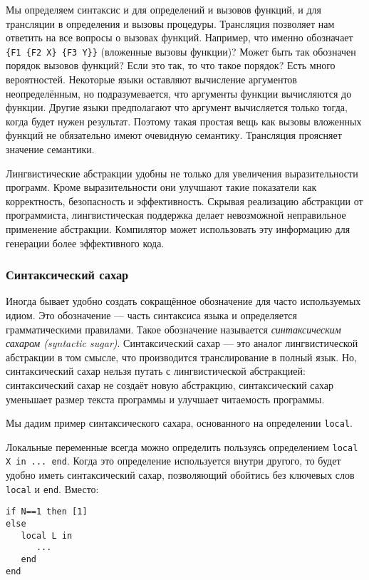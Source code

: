 Мы определяем синтаксис и для определений и вызовов функций, и для трансляции в определения и вызовы процедуры. Трансляция позволяет нам ответить на все вопросы о вызовах функций. Например, что именно обозначает \lstinline|{F1 {F2 X} {F3 Y}}| (вложенные вызовы функции)? Может быть так обозначен порядок вызовов функций? Если это так, то что такое порядок? Есть много вероятностей. Некоторые языки оставляют вычисление аргументов неопределённым, но подразумевается, что аргументы функции вычисляются до функции. Другие языки предполагают что аргумент вычисляется только тогда, когда будет нужен результат. Поэтому такая простая вещь как вызовы вложенных функций не обязательно имеют очевидную семантику. Трансляция проясняет значение семантики.

Лингвистические абстракции удобны не только для увеличения выразительности программ. Кроме выразительности они улучшают такие показатели как корректность, безопасность и эффективность. Скрывая реализацию абстракции от программиста, лингвистическая поддержка делает невозможной неправильное применение абстракции. Компилятор может использовать эту информацию для генерации более эффективного кода.

\subsubsection{Синтаксический сахар}

Иногда бывает удобно создать сокращённое обозначение для часто используемых идиом. Это обозначение --- часть синтаксиса языка и определяется грамматическими правилами. Такое обозначение называется \emph{синтаксическим сахаром (syntactic sugar)}. Синтаксический сахар --- это аналог лингвистической абстракции в том смысле, что производится транслирование в полный язык. Но, синтаксический сахар нельзя путать с лингвистической абстракцией: синтаксический сахар не создаёт новую абстракцию, синтаксический сахар уменьшает размер текста программы и улучшает читаемость программы.

Мы дадим пример синтаксического сахара, основанного на определении \lstinline|local|.

Локальные переменные всегда можно определить пользуясь определением \lstinline|local X in ... end|. Когда это определение используется внутри другого, то будет удобно иметь синтаксический сахар, позволяющий обойтись без ключевых слов \lstinline|local| и \lstinline|end|. Вместо:

\begin{lstlisting}
if N==1 then [1]
else
   local L in
      ...
   end
end
\end{lstlisting}

